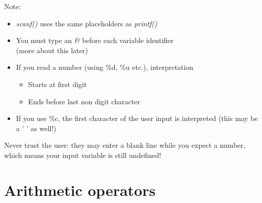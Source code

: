 \begin{frame}{Note:}
	\begin{itemize}
		\item \textit{scanf()} uses the same placeholders as \textit{printf()}
		\item You must type an \textit{\&} before each variable identifier \\
			(more about this later)
		\item If you read a number (using \%d, \%u etc.), interpretation
		\begin{itemize}
			\item Starts at first digit
			\item Ends before last non digit character
		\end{itemize}
		\item If you use \%c, the first character of the user input is interpreted (this may be a ' ' as well!)
	\end{itemize}
	Never trust the user: they may enter a blank line while you expect a number, which means your input variable is still undefined!
\end{frame}

\section{Arithmetic operators}
